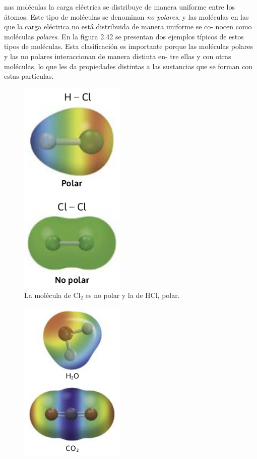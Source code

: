 \documentclass[12pt,addpoints,answers]{guia}
\begin{document}
\begin{questions}
{\begin{tcolorbox}
            nas moléculas la carga eléctrica se distribuye de manera uniforme entre los
            átomos. Este tipo de moléculas se denominan \emph{no polares}, y las moléculas
            en las que la carga eléctrica no está distribuida de manera uniforme se co-
            nocen como moléculas \emph{polares}. En la figura 2.42 se presentan dos ejemplos
            típicos de estos tipos de moléculas. Esta clasificación es importante porque
            las moléculas polares y las no polares interaccionan de manera distinta en-
            tre ellas y con otras moléculas, lo que les da propiedades distintas a las
            sustancias que se forman con estas partículas.
            \begin{figure}[H]
                \includegraphics[width=0.45\textwidth]{../images/20230321055533}
                \caption{La molécula de Cl$_2$ es no polar y la de HCl, polar.}
                \label{fig:20230321055533}
            \end{figure}
            \begin{figure}[H]
                \includegraphics[width=0.45\textwidth]{../images/20230321055646}

\end{figure}
\end{tcolorbox}}
\end{questions}
\end{document}
